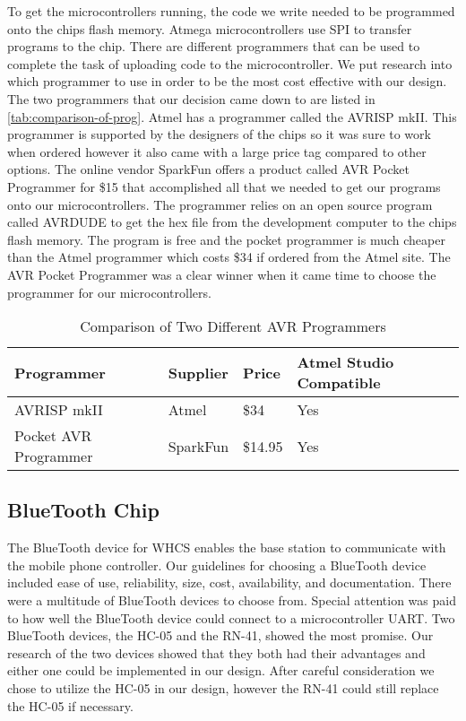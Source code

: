 To get the microcontrollers running, the code we write needed to be programmed
onto the chips flash memory. Atmega microcontrollers use SPI to transfer
programs to the chip. There are different programmers that can be used to
complete the task of uploading code to the microcontroller. We put research
into which programmer to use in order to be the most cost effective with our
design. The two programmers that our decision came down to are listed in
\autoref{tab:comparison-of-prog}. Atmel has a programmer called the AVRISP mkII. This
programmer is supported by the designers of the chips so it was sure to work
when ordered however it also came with a large price tag compared to other
options. The online vendor SparkFun offers a product called AVR Pocket
Programmer for \$15 that accomplished all that we needed to get our programs onto
our microcontrollers. The programmer relies on an open source program called
AVRDUDE to get the hex file from the development computer to the chips flash
memory. The program is free and the pocket programmer is much cheaper than the
Atmel programmer which costs \$34 if ordered from the Atmel site. The AVR
Pocket Programmer was a clear winner when it came time to choose the programmer
for our microcontrollers.

\begin{table}[H]
\centering
\begin{tabular}{|l|l|l|l|}
\hline
{\color{black} Programmer} &
{\color{black} Supplier} &
{\color{black} Price} &
{\color{black} Atmel Studio Compatible}\\\hline
{\color{black} AVRISP mkII} &
{\color{black} Atmel} &
{\color{black} \$34} &
{\color{black} Yes}\\\hline
{\color{black} Pocket AVR Programmer} &
{\color{black} SparkFun} &
{\color{black} \$14.95} &
{\color{black} Yes}\\\hline
\end{tabular}
\caption{Comparison of Two Different AVR Programmers}
\label{tab:comparison-of-prog}
\end{table}

\subsection{BlueTooth Chip}
The BlueTooth device for WHCS enables the base station to communicate with
the mobile phone controller. Our guidelines for choosing a BlueTooth device
included ease of use, reliability, size, cost, availability, and documentation.
There were a multitude of BlueTooth devices to choose from. Special attention
was paid to how well the BlueTooth device could connect to a microcontroller
UART. Two BlueTooth devices, the HC{}-05 and the RN{}-41, showed the most
promise. Our research of the two devices showed that they both had their
advantages and either one could be implemented in our design. After careful
consideration we chose to utilize the HC{}-05 in our design, however the
RN{}-41 could still replace the HC{}-05 if necessary.

